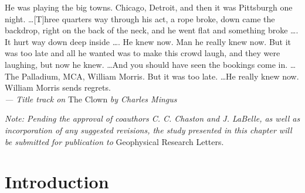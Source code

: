 \begin{flushright}
  \begin{minipage}[]{0.6\linewidth}
    \begin{flushright}
      He was playing the big towns. Chicago, Detroit, and then it was Pittsburgh
      one night. \dots [T]hree quarters way through his act, a rope broke, down
      came the backdrop, right on the back of the neck, and he went flat and
      something broke \dots . It hurt way down deep inside \dots . He knew
      now. Man he really knew now. But it was too late and all he wanted was to
      make this crowd laugh, and they were laughing, but now he knew. \dots And
      you should have seen the bookings come in. \dots The Palladium, MCA,
      William Morris. But it was too late. \dots He really knew now. William
      Morris sends regrets. \\{\small \emph{--- Title track on} The Clown
        \emph{by Charles Mingus}}
    \end{flushright}
  \end{minipage}
\end{flushright}
\vspace{\baselineskip}

\textit{Note: Pending the approval of coauthors C. C. Chaston and J. LaBelle, as
  well as incorporation of any suggested revisions, the study presented in this
  chapter will be submitted for publication to} Geophysical Research Letters.

  \section{Introduction}

